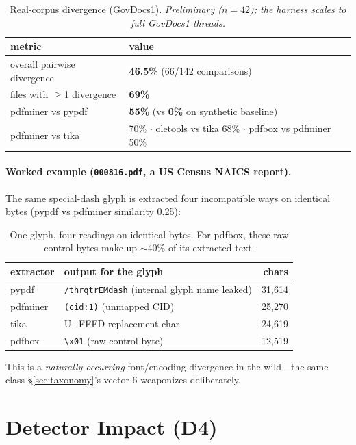 \documentclass[11pt]{article}
\newcommand{\code}[1]{\texttt{#1}}
\begin{document}
\begin{table}[h]
\centering
\small
\begin{tabular}{@{}l l@{}}
\toprule
metric & value \\
\midrule
overall pairwise divergence & \textbf{46.5\%} (66/142 comparisons) \\
files with $\geq$1 divergence & \textbf{69\%} \\
pdfminer vs pypdf & \textbf{55\%} (vs \textbf{0\%} on synthetic baseline) \\
pdfminer vs tika & 70\% $\cdot$ oletools vs tika 68\% $\cdot$ pdfbox vs pdfminer 50\% \\
\bottomrule
\end{tabular}
\caption{Real-corpus divergence (GovDocs1). \emph{Preliminary ($n=42$); the
harness scales to full GovDocs1 threads.}}
\end{table}

\paragraph{Worked example (\code{000816.pdf}, a US Census NAICS report).} The
same special-dash glyph is extracted four incompatible ways on identical bytes
(pypdf vs pdfminer similarity 0.25):

\begin{table}[h]
\centering
\small
\begin{tabular}{@{}l l r@{}}
\toprule
extractor & output for the glyph & chars \\
\midrule
pypdf & \code{/thrqtrEMdash} (internal glyph name leaked) & 31{,}614 \\
pdfminer & \code{(cid:1)} (unmapped CID) & 25{,}270 \\
tika & U+FFFD replacement char & 24{,}619 \\
pdfbox & \code{\textbackslash x01} (raw control byte) & 12{,}519 \\
\bottomrule
\end{tabular}
\caption{One glyph, four readings on identical bytes. For pdfbox, these raw
control bytes make up ${\sim}$40\% of its extracted text.}
\end{table}

This is a \emph{naturally occurring} font/encoding divergence in the wild---the
same class \S\ref{sec:taxonomy}'s vector 6 weaponizes deliberately.

\section{Detector Impact (D4)}
\label{sec:detector}
\end{document}
